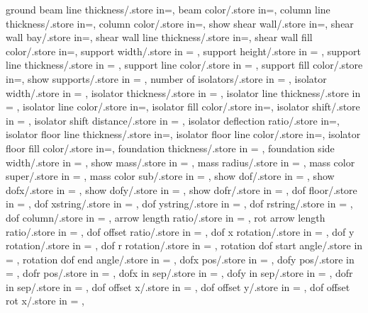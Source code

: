 {  ground beam line thickness/.store in=\groundbeamlinet,
  beam color/.store in=\beamcolor,
  column line thickness/.store in=\collinet,
  column color/.store in=\columncolor,
  show shear wall/.store in=\showshearwall,
  shear wall bay/.store in=\shearwallbay,
  shear wall line thickness/.store in=\shearwalllinet,
  shear wall fill color/.store in=\shearwallfillcolor,
  support width/.store in = \supportwidth,
  support height/.store in = \supportheight,
  support line thickness/.store in = \baselinet,
  support line color/.store in = \supportlinecolor,
  support fill color/.store in=\supportfillcolor,
  show supports/.store in = \showsupports,
  number of isolators/.store in = \numberofisolators,
  isolator width/.store in = \isolationwidth,
  isolator thickness/.store in = \isolationdepth,
  isolator line thickness/.store in = \isolinet,
  isolator line color/.store in=\isolinecolor,
  isolator fill color/.store in=\isofillcolor,
  isolator shift/.store in = \isoshiftyn,
  isolator shift distance/.store in = \isoshift,
  isolator deflection ratio/.store in=\isodeflratio,
  isolator floor line thickness/.store in=\isofloorlinethk,
  isolator floor line color/.store in=\isofloorlinecolor,
  isolator floor fill color/.store in=\isofloorfillcolor,
  foundation thickness/.store in = \foundationdepth,
  foundation side width/.store in = \foundsidew,
  show mass/.store in = \showmass,
  mass radius/.store in = \massrad,
  mass color super/.store in = \masscolorsuper,
  mass color sub/.store in = \masscolorsub,
  show dof/.store in = \showdof,
  show dofx/.store in = \shodofx,
  show dofy/.store in = \shodofy,
  show dofr/.store in = \shodofr,
  dof floor/.store in = \doflocfloor,
  dof xstring/.store in = \dofxstr,
  dof ystring/.store in = \dofystr,
  dof rstring/.store in = \dofrstr,
  dof column/.store in = \dofloccolumn,
  arrow length ratio/.store in = \arrowlenratio,
  rot arrow length ratio/.store in = \rotarrowlenratio,
  dof offset ratio/.store in = \dofoffsetratio,
  dof x rotation/.store in = \dofxrotation,
  dof y rotation/.store in = \dofyrotation,
  dof r rotation/.store in = \dofrrotation,
  rotation dof start angle/.store in = \rotdofstartangle,
  rotation dof end angle/.store in = \rotdofendangle,
  dofx pos/.store in = \dofposx,
  dofy pos/.store in = \dofposy,
  dofr pos/.store in = \dofposr,
  dofx in sep/.store in = \dofinnersepx,
  dofy in sep/.store in = \dofinnersepy,
  dofr in sep/.store in = \dofinnersepr,
  dof offset x/.store in = \dofoffsetx,
  dof offset y/.store in = \dofoffsety,
  dof offset rot x/.store in = \dofrotoffsetx,  
}
